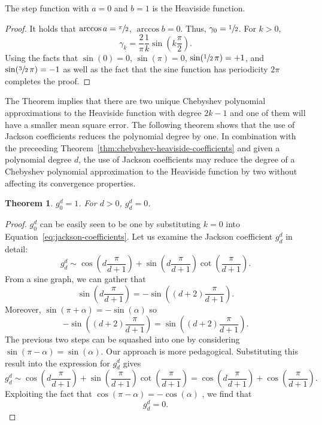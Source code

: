 \documentclass[%
	paper=a4,
	fontsize=10pt,
	DIV11,BCOR10mm,
	numbers=noenddot,
	abstract=yes
]{scrartcl}
\newtheorem{theorem}{Theorem}[section]
\theoremstyle{definition}
\begin{document}
The step function with $a = 0$ and $b = 1$ is the Heaviside function.

\begin{proof}
	It holds that $\arccos a = \sfrac{\pi}{2}$, $\arccos b = 0$. Thus, $\gamma_0
	= \sfrac{1}{2}$. For $k > 0$,
	\[ \gamma_k = \frac{2}{\pi} \frac{1}{k} \sin\left(k \frac{\pi}{2}\right). \]
	Using the facts that $\sin(0) = 0$, $\sin(\pi) = 0$, $\sin(\sfrac{1}{2} \,
	\pi) = +1$, and $\sin(\sfrac{3}{2} \, \pi) = -1$
	\cite[§4.3.46]{AbramowitzStegun} as well as the fact that the sine function
	has periodicity $2\pi$ \cite[§4.3.7]{AbramowitzStegun} completes the proof.
\end{proof}

The Theorem implies that there are two unique Chebyshev polynomial
approximations to the Heaviside function with degree $2k-1$ and one of them will
have a smaller mean square error. The following theorem shows that the use of
Jackson coefficients reduces the polynomial degree by one. In combination with
the preceeding Theorem~\ref{thm:chebyshev-heaviside-coefficients} and given a
polynomial degree $d$, the use of Jackson coefficients may reduce the degree of
a Chebyshev polynomial approximation to the Heaviside function by two without
affecting its convergence properties.

\begin{theorem}
	$g_0^d = 1$. For $d > 0$, $g_d^d = 0$.
\end{theorem}

\begin{proof}
	$g_0^d$ can be easily seen to be one by substituting $k = 0$ into
	Equation~\eqref{eq:jackson-coefficients}. Let us examine the Jackson
	coefficient $g_d^d$ in detail:
	\[
		g_d^d \sim
			\cos\left(d\frac{\pi}{d+1}\right) +
			\sin\left(d\frac{\pi}{d+1}\right) \cot \left(\frac{\pi}{d+1}\right).
	\]
	From a sine graph, we can gather that
	\[
		\sin \left(d \frac{\pi}{d+1}\right)
		= -\sin \left((d+2) \frac{\pi}{d+1}\right).
	\]
	Moreover, $\sin(\pi + \alpha) = -\sin(\alpha)$
	\cite[§4.3.44]{AbramowitzStegun} so
	\[
		-\sin \left( (d+2) \frac{\pi}{d+1} \right)
		= \sin \left( (d+2) \frac{\pi}{d+1} \right).
	\]
	The previous two steps can be squashed into one by considering $\sin(\pi -
	\alpha) = \sin(\alpha)$. Our approach is more pedagogical. Substituting this
	result into the expression for $g_d^d$ gives
	\[
		g_d^d \sim
			\cos \left(d \frac{\pi}{d+1}\right) +
			\sin \left(\frac{\pi}{d+1}\right) \cot \left(\frac{\pi}{d+1}\right)
		= \cos\left(d\frac{\pi}{d+1}\right) + \cos\left(\frac{\pi}{d+1}\right).
	\]
	Exploiting the fact that $\cos(\pi - \alpha) = -\cos(\alpha)$
	\cite[§4.3.44]{AbramowitzStegun}, we find that
	\[ g_d^d = 0. \]
\end{proof}
\end{document}
